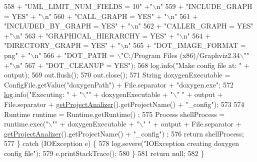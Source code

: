 \begin{DoxyCode}
558                     + \textcolor{stringliteral}{"UML\_LIMIT\_NUM\_FIELDS = 10"} +\textcolor{stringliteral}{"\(\backslash\)n"}
559                     + \textcolor{stringliteral}{"INCLUDE\_GRAPH = YES"} + \textcolor{stringliteral}{"\(\backslash\)n"}
560                     + \textcolor{stringliteral}{"CALL\_GRAPH = YES"} + \textcolor{stringliteral}{"\(\backslash\)n"}
561                     + \textcolor{stringliteral}{"INCLUDED\_BY\_GRAPH = YES"} + \textcolor{stringliteral}{"\(\backslash\)n"}
562                     + \textcolor{stringliteral}{"CALLER\_GRAPH = YES"} +\textcolor{stringliteral}{"\(\backslash\)n"}
563                     + \textcolor{stringliteral}{"GRAPHICAL\_HIERARCHY = YES"} + \textcolor{stringliteral}{"\(\backslash\)n"}
564                     + \textcolor{stringliteral}{"DIRECTORY\_GRAPH = YES"} + \textcolor{stringliteral}{"\(\backslash\)n"}
565                     + \textcolor{stringliteral}{"DOT\_IMAGE\_FORMAT = png"} + \textcolor{stringliteral}{"\(\backslash\)n"}
566                     + \textcolor{stringliteral}{"DOT\_PATH = \(\backslash\)"C:/Program Files (x86)/Graphviz2.34\(\backslash\)""} +\textcolor{stringliteral}{"\(\backslash\)n"}
567                     + \textcolor{stringliteral}{"DOT\_CLEANUP = YES"});
568             log.info(\textcolor{stringliteral}{"Make config file at: "} + output);
569             out.flush();
570             out.close();
571             String doxygenExecutable = ConfigFile.getValue(\textcolor{stringliteral}{"doxygenPath"}) + File.separator + \textcolor{stringliteral}{"doxygen.exe"};
572             \hyperlink{classit_1_1isislab_1_1masonhelperdocumentation_1_1analizer_1_1_global_utility_afc01085ddd5741383afdb4237343c49c}{log}.info(\textcolor{stringliteral}{"Executing: "} + \textcolor{stringliteral}{"\(\backslash\)""} + doxygenExecutable + \textcolor{stringliteral}{"\(\backslash\)" "} + output + File.separator + 
      \hyperlink{classit_1_1isislab_1_1masonhelperdocumentation_1_1analizer_1_1_global_utility_af6bcca0c06ec6fa8c2b2b88f5050914c}{getProjectAnalizer}().getProjectName() + \textcolor{stringliteral}{"\_config"});
573             
574             Runtime runtime = Runtime.getRuntime() ;
575             Process shellProcess = runtime.exec(\textcolor{stringliteral}{"\(\backslash\)""} + doxygenExecutable + \textcolor{stringliteral}{"\(\backslash\)" "} + output + File.separator 
      + \hyperlink{classit_1_1isislab_1_1masonhelperdocumentation_1_1analizer_1_1_global_utility_af6bcca0c06ec6fa8c2b2b88f5050914c}{getProjectAnalizer}().getProjectName() + \textcolor{stringliteral}{"\_config"}) ;
576             \textcolor{keywordflow}{return} shellProcess;
577         \} \textcolor{keywordflow}{catch} (IOException e) \{
578             log.severe(\textcolor{stringliteral}{"IOException creating doxygen config file"});
579             e.printStackTrace();
580         \}
581         \textcolor{keywordflow}{return} null;        
582     \}
\end{DoxyCode}


